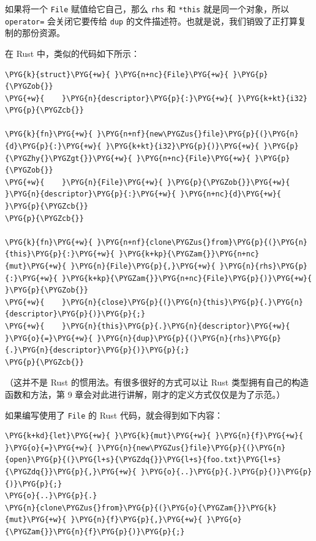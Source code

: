 如果将一个 \texttt{File} 赋值给它自己，那么 \texttt{rhs} 和 \texttt{*this} 就是同一个对象，所以 \texttt{operator=} 会关闭它要传给 \texttt{dup} 的文件描述符。也就是说，我们销毁了正打算复制的那份资源。

在 Rust 中，类似的代码如下所示：

\begin{Verbatim}[commandchars=\\\{\},breaklines=true,breakanywhere=true,fontsize=\codefont,xleftmargin=17bp]
\PYG{k}{struct}\PYG{+w}{ }\PYG{n+nc}{File}\PYG{+w}{ }\PYG{p}{\PYGZob{}}
\PYG{+w}{    }\PYG{n}{descriptor}\PYG{p}{:}\PYG{+w}{ }\PYG{k+kt}{i32}
\PYG{p}{\PYGZcb{}}

\PYG{k}{fn}\PYG{+w}{ }\PYG{n+nf}{new\PYGZus{}file}\PYG{p}{(}\PYG{n}{d}\PYG{p}{:}\PYG{+w}{ }\PYG{k+kt}{i32}\PYG{p}{)}\PYG{+w}{ }\PYG{p}{\PYGZhy{}\PYGZgt{}}\PYG{+w}{ }\PYG{n+nc}{File}\PYG{+w}{ }\PYG{p}{\PYGZob{}}
\PYG{+w}{    }\PYG{n}{File}\PYG{+w}{ }\PYG{p}{\PYGZob{}}\PYG{+w}{ }\PYG{n}{descriptor}\PYG{p}{:}\PYG{+w}{ }\PYG{n+nc}{d}\PYG{+w}{ }\PYG{p}{\PYGZcb{}}
\PYG{p}{\PYGZcb{}}

\PYG{k}{fn}\PYG{+w}{ }\PYG{n+nf}{clone\PYGZus{}from}\PYG{p}{(}\PYG{n}{this}\PYG{p}{:}\PYG{+w}{ }\PYG{k+kp}{\PYGZam{}}\PYG{n+nc}{mut}\PYG{+w}{ }\PYG{n}{File}\PYG{p}{,}\PYG{+w}{ }\PYG{n}{rhs}\PYG{p}{:}\PYG{+w}{ }\PYG{k+kp}{\PYGZam{}}\PYG{n+nc}{File}\PYG{p}{)}\PYG{+w}{ }\PYG{p}{\PYGZob{}}
\PYG{+w}{    }\PYG{n}{close}\PYG{p}{(}\PYG{n}{this}\PYG{p}{.}\PYG{n}{descriptor}\PYG{p}{)}\PYG{p}{;}
\PYG{+w}{    }\PYG{n}{this}\PYG{p}{.}\PYG{n}{descriptor}\PYG{+w}{ }\PYG{o}{=}\PYG{+w}{ }\PYG{n}{dup}\PYG{p}{(}\PYG{n}{rhs}\PYG{p}{.}\PYG{n}{descriptor}\PYG{p}{)}\PYG{p}{;}
\PYG{p}{\PYGZcb{}}
\end{Verbatim}

（这并不是 Rust 的惯用法。有很多很好的方式可以让 Rust 类型拥有自己的构造函数和方法，第 9 章会对此进行讲解，刚才的定义方式仅仅是为了示范。）

如果编写使用了 \texttt{File} 的 Rust 代码，就会得到如下内容：

\begin{Verbatim}[commandchars=\\\{\},breaklines=true,breakanywhere=true,fontsize=\codefont,xleftmargin=17bp]
\PYG{k+kd}{let}\PYG{+w}{ }\PYG{k}{mut}\PYG{+w}{ }\PYG{n}{f}\PYG{+w}{ }\PYG{o}{=}\PYG{+w}{ }\PYG{n}{new\PYGZus{}file}\PYG{p}{(}\PYG{n}{open}\PYG{p}{(}\PYG{l+s}{\PYGZdq{}}\PYG{l+s}{foo.txt}\PYG{l+s}{\PYGZdq{}}\PYG{p}{,}\PYG{+w}{ }\PYG{o}{..}\PYG{p}{.}\PYG{p}{)}\PYG{p}{)}\PYG{p}{;}
\PYG{o}{..}\PYG{p}{.}
\PYG{n}{clone\PYGZus{}from}\PYG{p}{(}\PYG{o}{\PYGZam{}}\PYG{k}{mut}\PYG{+w}{ }\PYG{n}{f}\PYG{p}{,}\PYG{+w}{ }\PYG{o}{\PYGZam{}}\PYG{n}{f}\PYG{p}{)}\PYG{p}{;}
\end{Verbatim}

